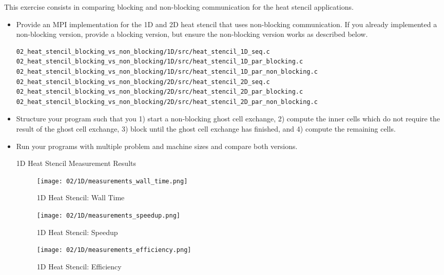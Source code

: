 \documentclass[UTF-8]{article}
\begin{document}
    This exercise consists in comparing blocking and non-blocking communication for the heat stencil applications. 
    \newline
    \begin{itemize}
    	\item Provide an MPI implementation for the 1D and 2D heat stencil that uses non-blocking 
            communication. If you already implemented a non-blocking version, provide a blocking version, but ensure the non-blocking version works as described below.
\begin{lstlisting}
02_heat_stencil_blocking_vs_non_blocking/1D/src/heat_stencil_1D_seq.c
02_heat_stencil_blocking_vs_non_blocking/1D/src/heat_stencil_1D_par_blocking.c
02_heat_stencil_blocking_vs_non_blocking/1D/src/heat_stencil_1D_par_non_blocking.c
02_heat_stencil_blocking_vs_non_blocking/2D/src/heat_stencil_2D_seq.c
02_heat_stencil_blocking_vs_non_blocking/2D/src/heat_stencil_2D_par_blocking.c
02_heat_stencil_blocking_vs_non_blocking/2D/src/heat_stencil_2D_par_non_blocking.c
\end{lstlisting}
    	\item Structure your program such that you 1) start a non-blocking ghost cell exchange, 2) 
            compute the inner cells which do not require the result of the ghost cell exchange, 3) block until the ghost cell exchange has finished, and 4) compute the remaining cells.
    	\item Run your programs with multiple problem and machine sizes and compare both versions.
            \begin{table}[H]
                \hspace{-2cm}
                
                \caption{1D Heat Stencil Measurement Results}
                \label{table:02_1D_measurements_table}
            \end{table}
            \begin{figure}[H]
                \centering
                \texttt{[image: 02/1D/measurements\_wall\_time.png]}
                \caption{1D Heat Stencil: Wall Time}
                \label{fig:02_1D_measurements_wall_time}
            \end{figure}
            \begin{figure}[H]
                \centering
                \texttt{[image: 02/1D/measurements\_speedup.png]}
                \caption{1D Heat Stencil: Speedup}
                \label{fig:02_1D_measurements_speedup}
            \end{figure}
            \begin{figure}[H]
                \centering
                \texttt{[image: 02/1D/measurements\_efficiency.png]}
                \caption{1D Heat Stencil: Efficiency}
                \label{fig:02_1D_measurements_efficiency}
            \end{figure}


\end{itemize}
\end{document}
